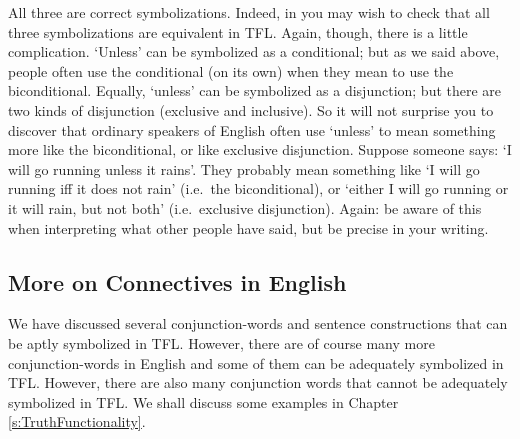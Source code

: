 All three are correct symbolizations. Indeed, in you may wish to check that all three symbolizations are equivalent in TFL.
Again, though, there is a little complication. `Unless' can be symbolized as a conditional; but as we said above, people often use the conditional (on its own) when they mean to use the biconditional. Equally, `unless' can be symbolized as a disjunction; but there are two kinds of disjunction (exclusive and inclusive). So it will not surprise you to discover that ordinary speakers of English often use `unless' to mean something more like the biconditional, or like exclusive disjunction. Suppose someone says: `I will go running unless it rains'. They probably mean something like `I will go running iff it does not rain' (i.e.\ the biconditional), or  `either I will go running or it will rain, but not both' (i.e.\ exclusive disjunction). Again: be aware of this when interpreting what other people have said, but be precise in your writing.

\subsection{More on Connectives in English}
We have discussed several conjunction-words and sentence constructions that can be aptly symbolized in TFL. However, there are of course many more conjunction-words in English and some of them can be adequately symbolized in TFL. However, there are also many conjunction words that cannot be adequately symbolized in TFL. We shall discuss some examples in Chapter \ref{s:TruthFunctionality}.

